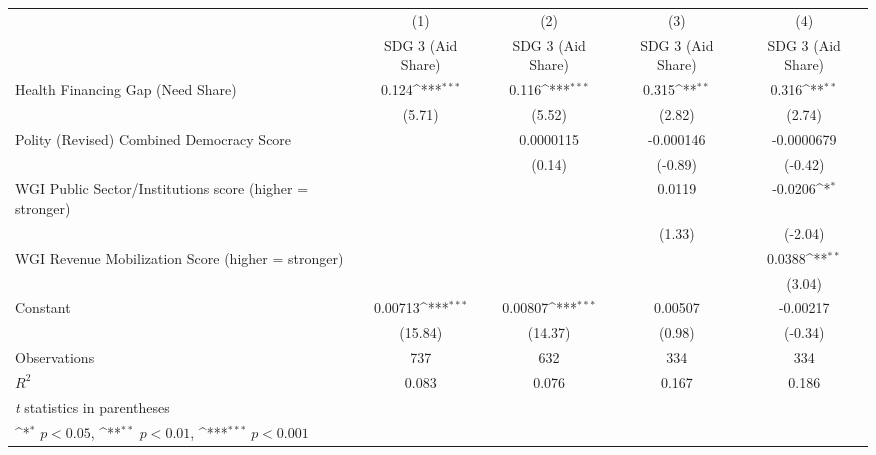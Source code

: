 {
\def\sym#1{\ifmmode^{#1}\else\(^{#1}\)\fi}
\begin{tabular}{l*{4}{c}}
\hline\hline
                &\multicolumn{1}{c}{(1)}&\multicolumn{1}{c}{(2)}&\multicolumn{1}{c}{(3)}&\multicolumn{1}{c}{(4)}\\
                &\multicolumn{1}{c}{SDG 3 (Aid Share)}&\multicolumn{1}{c}{SDG 3 (Aid Share)}&\multicolumn{1}{c}{SDG 3 (Aid Share)}&\multicolumn{1}{c}{SDG 3 (Aid Share)}\\
\hline
Health Financing Gap (Need Share)&    0.124\sym{***}&    0.116\sym{***}&    0.315\sym{**} &    0.316\sym{**} \\
                &   (5.71)         &   (5.52)         &   (2.82)         &   (2.74)         \\
[1em]
Polity (Revised) Combined Democracy Score&                  &0.0000115         &-0.000146         &-0.0000679         \\
                &                  &   (0.14)         &  (-0.89)         &  (-0.42)         \\
[1em]
WGI Public Sector/Institutions score (higher = stronger)&                  &                  &   0.0119         &  -0.0206\sym{*}  \\
                &                  &                  &   (1.33)         &  (-2.04)         \\
[1em]
WGI Revenue Mobilization Score (higher = stronger)&                  &                  &                  &   0.0388\sym{**} \\
                &                  &                  &                  &   (3.04)         \\
[1em]
Constant        &  0.00713\sym{***}&  0.00807\sym{***}&  0.00507         & -0.00217         \\
                &  (15.84)         &  (14.37)         &   (0.98)         &  (-0.34)         \\
\hline
Observations    &      737         &      632         &      334         &      334         \\
\(R^{2}\)       &    0.083         &    0.076         &    0.167         &    0.186         \\
\hline\hline
\multicolumn{5}{l}{\footnotesize \textit{t} statistics in parentheses}\\
\multicolumn{5}{l}{\footnotesize \sym{*} \(p<0.05\), \sym{**} \(p<0.01\), \sym{***} \(p<0.001\)}\\
\end{tabular}
}
